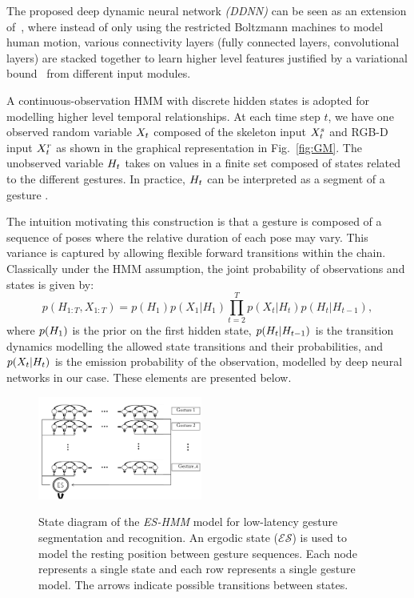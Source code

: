 The proposed deep dynamic neural network \emph{(DDNN)} can be seen as an extension of~\cite{diwucvpr14}, where instead of only using the restricted Boltzmann machines to model human motion, various connectivity layers (fully connected layers, convolutional layers) are stacked together to learn higher level features justified by a variational bound~\cite{hinton2006fast} from different input modules.

A continuous-observation HMM with discrete hidden states is adopted for modelling higher level temporal relationships.
At each time step $t$, we have one observed random variable $X_t$
composed of the skeleton input $X^{s}_t$ and RGB-D input $X^{r}_t$
as shown in the graphical representation in Fig.~\ref{fig:GM}.
%
 The unobserved variable $H_t$ takes on values in a finite set  \finiteset composed of \numberhiddenstate states related to
the different gestures. In practice,  $H_t$ can be interpreted as a segment of a gesture \gesturea{}.

 The intuition motivating this construction is that a gesture is composed of a sequence of poses where the relative duration of each pose may vary. This variance is captured by allowing flexible forward transitions within the chain.
 Classically under the HMM assumption, the joint probability of observations and states is given by:
\begin{equation}
p(H_{1:T},X_{1:T}) = p(H_1)p(X_1 | H_1) \prod^{T}_{t=2} p(X_t | H_t ) p(H_t | H_{t-1}),
\label{HMM_GM_1}
\end{equation}
where $p(H_1)$ is the prior on the first hidden state, $p(H_t|H_{t-1})$
is the transition dynamics modelling the allowed state transitions and their probabilities,
 and $p(X_t | H_t )$ is the emission probability of the observation,
modelled by  deep neural networks in our case. These elements are presented below.



\begin{figure}[t]
  \centering
  \includegraphics[width=0.48\textwidth]{images/HMM_2_new}\\
  \caption{
    State diagram of the \emph{ES-HMM} model for low-latency gesture segmentation and recognition. An ergodic state (\emph{$\mathcal{ES}$}) is used to model the resting position between gesture sequences. Each node represents a single state and each row represents a single gesture model. The arrows indicate possible transitions between states.}
    \label{HMM_ES}
\end{figure}


